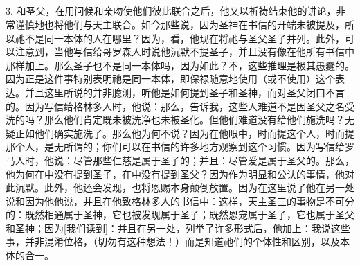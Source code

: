 \subsection{}

3. 和圣父，在用问候和亲吻使他们彼此联合之后，他又以祈祷结束他的讲论，非常谨慎地也将他们与天主联合。如今那些说，因为圣神在书信的开端未被提及，所以祂不是同一本体的人在哪里？因为，看，他现在将祂与圣父圣子并列。此外，可以注意到，当他写信给哥罗森人时说他沉默不提圣子，并且没有像在他所有书信中那样加上。那么圣子也不是同一本体吗，因为如此？不，这些推理是极其愚蠢的。因为正是这件事特别表明祂是同一本体，即保禄随意地使用（或不使用）这个表达。并且这里所说的并非臆测，听他是如何提到圣子和圣神，而对圣父闭口不言的。因为写信给格林多人时，他说：那么，告诉我，这些人难道不是因圣父之名受洗的吗？那么他们肯定既未被洗净也未被圣化。但他们难道没有给他们施洗吗？无疑正如他们确实施洗了。那么他为何不说？因为在他眼中，时而提这个人，时而提那个人，是无所谓的；你们可以在书信的许多地方观察到这个习惯。因为写信给罗马人时，他说：尽管那些仁慈是属于圣子的；并且：尽管爱是属于圣父的。那么，他为何在中没有提到圣子，在中没有提到圣父？因为作为明显和公认的事情，他对此沉默。此外，他还会发现，也将恩赐本身颠倒放置。因为在这里说了他在另一处说和因为他他说，并且在他致格林多人的书信中：这样，天主圣三的事物是不可分的：既然相通属于圣神，它也被发现属于圣子；既然恩宠属于圣子，它也属于圣父和圣神；因为[我们读到]：并且在另一处，列举了许多形式后，他加上：我说这些事，并非混淆位格，（切勿有这种想法！）而是知道祂们的个体性和区别，以及本体的合一。\par

